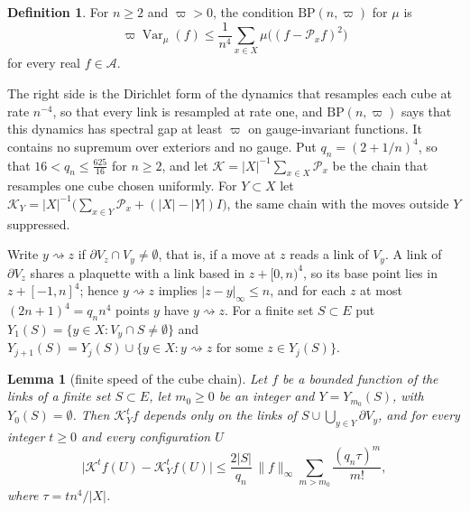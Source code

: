\documentclass[aps,prd,twocolumn,superscriptaddress,nofootinbib,longbibliography,floatfix,amsmath,amssymb,10pt]{revtex4-2}
\newtheorem{lemma}[theorem]{Lemma}
\theoremstyle{definition}
\newtheorem{definition}[theorem]{Definition}
\theoremstyle{remark}
\newcommand{\Var}{\operatorname{Var}}
\begin{document}
\begin{definition}\label{def:avgcube}
For $n\ge2$ and $\varpi>0$, the condition $\mathrm{BP}(n,\varpi)$ for $\mu$
is
\[
\varpi\Var_\mu(f)\le\frac1{n^4}\sum_{x\in X}\mu\bigl((f-\mathcal P_xf)^2
\bigr)
\]
for every real $f\in\mathcal A$.
\end{definition}

The right side is the Dirichlet form of the dynamics that resamples each
cube at rate $n^{-4}$, so that every link is resampled at rate one, and
$\mathrm{BP}(n,\varpi)$ says that this dynamics has spectral gap at least
$\varpi$ on gauge-invariant functions. It contains no supremum over
exteriors and no gauge. Put $q_n=(2+1/n)^4$, so that $16<q_n\le\frac{625}{16}$
for $n\ge2$, and let $\mathcal K=\lvert X\rvert^{-1}\sum_{x\in X}\mathcal P_x$
be the chain that resamples one cube chosen uniformly. For $Y\subset X$ let
$\mathcal K_Y=\lvert X\rvert^{-1}\bigl(\sum_{x\in Y}\mathcal P_x+(\lvert X
\rvert-\lvert Y\rvert)I\bigr)$, the same chain with the moves outside $Y$
suppressed.

Write $y\rightsquigarrow z$ if $\partial V_z\cap V_y\ne\emptyset$, that is,
if a move at $z$ reads a link of $V_y$. A link of $\partial V_z$ shares a
plaquette with a link based in $z+[0,n)^4$, so its base point lies in
$z+[-1,n]^4$; hence $y\rightsquigarrow z$ implies $\lvert z-y\rvert_\infty
\le n$, and for each $z$ at most $(2n+1)^4=q_nn^4$ points $y$ have
$y\rightsquigarrow z$. For a finite set $S\subset E$ put $Y_1(S)=\{y\in X:V_y
\cap S\ne\emptyset\}$ and $Y_{j+1}(S)=Y_j(S)\cup\{y\in X:y\rightsquigarrow
z\text{ for some }z\in Y_j(S)\}$.

\begin{lemma}[finite speed of the cube chain]\label{lem:avgspeed}
Let $f$ be a bounded function of the links of a finite set $S\subset E$, let
$m_0\ge0$ be an integer and $Y=Y_{m_0}(S)$, with $Y_0(S)=\emptyset$. Then
$\mathcal K_Y^tf$ depends only on the links of $S\cup\bigcup_{y\in Y}\partial
V_y$, and for every integer $t\ge0$ and every configuration $U$
\[
\bigl\lvert\mathcal K^tf(U)-\mathcal K_Y^tf(U)\bigr\rvert\le\frac{2\lvert S
\rvert}{q_n}\,\lVert f\rVert_\infty\sum_{m>m_0}\frac{(q_n\tau)^m}{m!},
\]
where $\tau=tn^4/\lvert X\rvert$.
\end{lemma}
\end{document}
